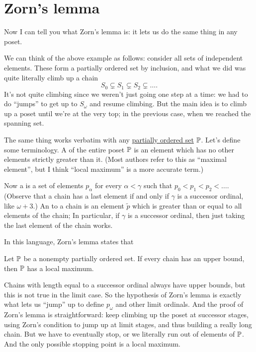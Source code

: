 \section{Zorn's lemma}
Now I can tell you what Zorn's lemma is:
it lets us do the same thing in any poset.

We can think of the above example as follows:
consider all sets of independent elements.
These form a partially ordered set by inclusion, and what we did
was quite literally climb up a chain
\[ S_0 \subsetneq S_1 \subsetneq S_2 \subsetneq \dots. \]
It's not quite climbing since we weren't just going one step at a time:
we had to do ``jumps'' to get up to $S_\omega$ and resume climbing.
But the main idea is to climb up a poset until we're at the very top;
in the previous case, when we reached the spanning set.

The same thing works verbatim with any \href{https://en.wikipedia.org/wiki/Partially_ordered_set}{partially ordered set}
$\mathbb P$.
Let's define some terminology.
A  of the entire poset $\mathbb P$ is an element
which has no other elements strictly greater than it.
(Most authors refer to this as ``maximal element'', but I think
``local maximum'' is a more accurate term.)

Now a  is a set of elements $p_\alpha$ for every $\alpha < \gamma$
such that $p_0 < p_1 < p_2 < \dots$.
(Observe that a chain has a last element if and only if $\gamma$ is a successor ordinal, like $\omega+3$.)
An  to a chain is an element $\tilde p$ which is greater than or equal
to all elements of the chain;
In particular, if $\gamma$ is a successor ordinal, then just taking the last element of the chain works.

In this language, Zorn's lemma states that
\begin{theorem}
	Let $\mathbb P$ be a nonempty partially ordered set.
	If every chain has an upper bound,
	then $\mathbb P$ has a local maximum.
\end{theorem}

Chains with length equal to a successor ordinal always have upper bounds,
but this is not true in the limit case.
So the hypothesis of Zorn's lemma is exactly what
lets us ``jump'' up to define $p_\omega$ and other limit ordinals.
And the proof of Zorn's lemma is straightforward: keep climbing up the poset at successor stages,
using Zorn's condition to jump up at limit stages, and thus building a really long chain.
But we have to eventually stop, or we literally run out of elements of $\mathbb P$.
And the only possible stopping point is a local maximum.

